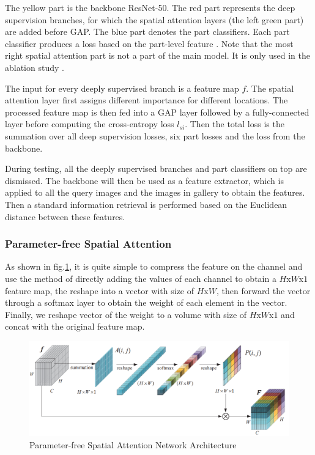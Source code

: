 The yellow part is the backbone ResNet-50\cite{He_2016_CVPR}. The red part represents the deep supervision branches, for which the spatial attention layers (the left green part) are added before \acrshort{GAP}. The blue part denotes the part classifiers. Each part classifier produces a loss based on the part-level feature \cite{SA}. Note that the most right spatial attention part is not a part of the main model. It is only used in the ablation study \cite{SA}.\par
The input for every deeply supervised branch is a feature map $f$. The spatial attention layer first assigns different importance for different locations. The processed feature map is then fed into a \acrshort{GAP} layer followed by a fully-connected layer before computing the cross-entropy loss $l_{si}$\cite{SA}. Then the total loss is the summation over all deep supervision losses, six part losses and the loss from the backbone\cite{SA}.\par
During testing, all the deeply supervised branches and
part classifiers on top are dismissed. The backbone will then
be used as a feature extractor, which is applied to all the
query images and the images in gallery to obtain the features\cite{SA}. Then a standard information retrieval is performed
based on the Euclidean distance between these features\cite{SA}.
\subsubsection{Parameter-free Spatial Attention}
\hspace{0.45cm}As shown in fig.\ref{fig:sa}\cite{SA}, it is quite simple to compress the feature on the channel and use the method of directly adding the values of each channel to obtain a $H$x$W$x$1$ feature map, the reshape into a vector with size of $H$x$W$, then forward the vector through a softmax layer to obtain the weight of each element in the vector. Finally, we reshape vector of the weight to a volume with size of $H$x$W$x$1$ and concat with the original feature map.

\begin{figure}[h!]
    \centering
    \includegraphics[scale=0.4]{Chapters/Fig/attention_sa.PNG}
    \caption{Parameter-free Spatial Attention Network Architecture}
    \label{fig:sa}
\end{figure}
\pagebreak
